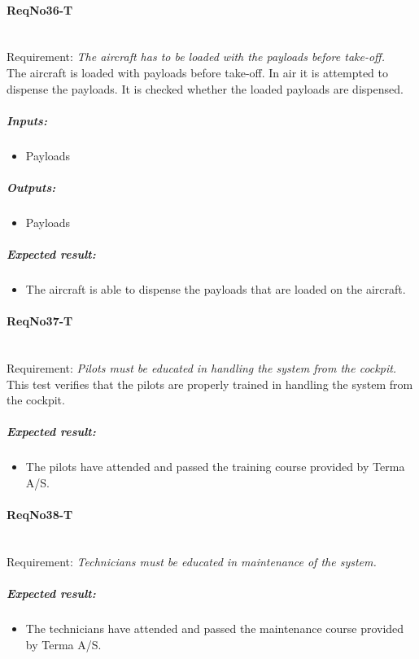 \paragraph{ReqNo36-T}\mbox{}\\ %
Requirement: \textit{The aircraft has to be loaded with the payloads before take-off.}
\\
The aircraft is loaded with payloads before take-off. In air it is attempted to dispense the payloads. It is checked whether the loaded payloads are dispensed.
\\
	\subparagraph{Inputs:}
	\begin{itemize}
	\item Payloads
	\end{itemize}
	\subparagraph{Outputs:}
	\begin{itemize}
	\item Payloads
	\end{itemize}
	\subparagraph{Expected result:}
	\begin{itemize}
	\item The aircraft is able to dispense the payloads that are loaded on the aircraft.
	\end{itemize}


\paragraph{ReqNo37-T}\mbox{}\\ %
Requirement: \textit{Pilots must be educated in handling the system from the cockpit.}
\\
This test verifies that the pilots are properly trained in handling the system from the cockpit.
\\
\subparagraph{Expected result:}
	\begin{itemize}
	\item The pilots have attended and passed the training course provided by Terma	A/S.
	\end{itemize}

\paragraph{ReqNo38-T}\mbox{}\\ %
Requirement: \textit{Technicians must be educated in maintenance of the system.}\\

\subparagraph{Expected result:}
	\begin{itemize}
	\item The technicians have attended and passed the maintenance course provided by Terma A/S.
	\end{itemize}

